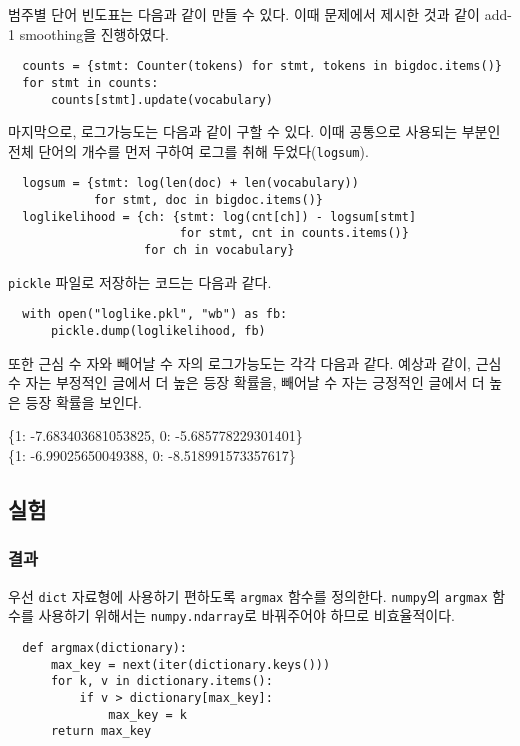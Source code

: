 \documentclass[a4paper,11pt]{scrartcl}
\begin{document}
\pagebreak
범주별 단어 빈도표는 다음과 같이 만들 수 있다. 이때 문제에서 제시한 것과 같이 add-1 smoothing을 진행하였다.
\begin{lstlisting}
  counts = {stmt: Counter(tokens) for stmt, tokens in bigdoc.items()}
  for stmt in counts:
      counts[stmt].update(vocabulary)
\end{lstlisting}

마지막으로, 로그가능도는 다음과 같이 구할 수 있다. 이때 공통으로 사용되는 부분인 전체 단어의 개수를 먼저 구하여 로그를 취해 두었다(\lstinline{logsum}).
\begin{lstlisting}
  logsum = {stmt: log(len(doc) + len(vocabulary))
            for stmt, doc in bigdoc.items()}
  loglikelihood = {ch: {stmt: log(cnt[ch]) - logsum[stmt]
                        for stmt, cnt in counts.items()}
                   for ch in vocabulary}
\end{lstlisting}

\lstinline{pickle} 파일로 저장하는 코드는 다음과 같다.
\begin{lstlisting}
  with open("loglike.pkl", "wb") as fb:
      pickle.dump(loglikelihood, fb)
\end{lstlisting}

또한 근심 수 자와 빼어날 수 자의 로그가능도는 각각 다음과 같다. 예상과 같이, 근심 수 자는 부정적인 글에서 더 높은 등장 확률을, 빼어날 수 자는 긍정적인 글에서 더 높은 등장 확률을 보인다.
\par\medskip
\begin{longfbox}[margin-left=1em]
  \ttfamily
  \noindent \{1: -7.683403681053825, 0: -5.685778229301401\} \\
  \{1: -6.99025650049388, 0: -8.518991573357617\}
\end{longfbox}

\subsection{실험}
\subsubsection{결과}
우선 \lstinline{dict} 자료형에 사용하기 편하도록 \lstinline{argmax} 함수를 정의한다. \lstinline{numpy}의 \lstinline{argmax} 함수를 사용하기 위해서는 \lstinline{numpy.ndarray}로 바꿔주어야 하므로 비효율적이다.
\begin{lstlisting}
  def argmax(dictionary):
      max_key = next(iter(dictionary.keys()))
      for k, v in dictionary.items():
          if v > dictionary[max_key]:
              max_key = k
      return max_key
\end{lstlisting}
\end{document}

